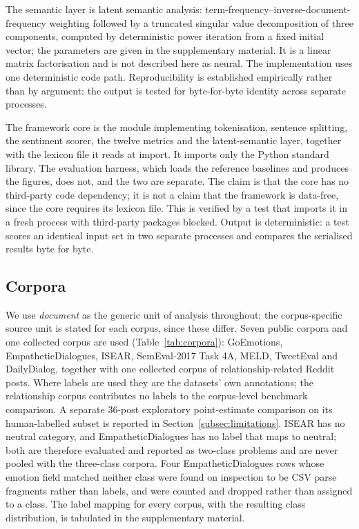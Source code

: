 \documentclass[fleqn,10pt]{wlscirep}
\begin{document}
The semantic layer is latent semantic analysis\cite{deerwester1990,landauer1998}: term-frequency--inverse-document-frequency weighting followed by a truncated singular value decomposition of three components, computed by deterministic power iteration from a fixed initial vector; the parameters are given in the supplementary material. It is a linear matrix factorisation and is not described here as neural. The implementation uses one deterministic code path. Reproducibility is established empirically rather than by argument: the output is tested for byte-for-byte identity across separate processes.

The framework core is the module implementing tokenisation, sentence splitting, the sentiment scorer, the twelve metrics and the latent-semantic layer, together with the lexicon file it reads at import. It imports only the Python standard library. The evaluation harness, which loads the reference baselines and produces the figures, does not, and the two are separate. The claim is that the core has no third-party code dependency; it is not a claim that the framework is data-free, since the core requires its lexicon file. This is verified by a test that imports it in a fresh process with third-party packages blocked. Output is deterministic: a test scores an identical input set in two separate processes and compares the serialised results byte for byte.

\subsection{Corpora}\label{subsec:corpora}

We use \emph{document} as the generic unit of analysis throughout; the corpus-specific source unit is stated for each corpus, since these differ. Seven public corpora and one collected corpus are used (Table~\ref{tab:corpora}): GoEmotions\cite{demszky2020}, EmpatheticDialogues\cite{rashkin2019}, ISEAR\cite{scherer1994}, SemEval-2017 Task 4A\cite{rosenthal2017}, MELD\cite{poria2019}, TweetEval\cite{barbieri2020} and DailyDialog\cite{li2017}, together with one collected corpus of relationship-related Reddit posts. Where labels are used they are the datasets' own annotations; the relationship corpus contributes no labels to the corpus-level benchmark comparison. A separate 36-post exploratory point-estimate comparison on its human-labelled subset is reported in Section~\ref{subsec:limitations}. ISEAR has no neutral category, and EmpatheticDialogues has no label that maps to neutral; both are therefore evaluated and reported as two-class problems and are never pooled with the three-class corpora. Four EmpatheticDialogues rows whose emotion field matched neither class were found on inspection to be CSV parse fragments rather than labels, and were counted and dropped rather than assigned to a class. The label mapping for every corpus, with the resulting class distribution, is tabulated in the supplementary material.
\end{document}
